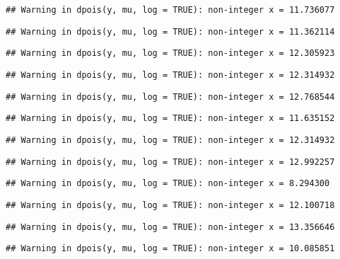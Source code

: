 \documentclass[
]{article}
\begin{document}
\begin{verbatim}
## Warning in dpois(y, mu, log = TRUE): non-integer x = 11.736077
\end{verbatim}

\begin{verbatim}
## Warning in dpois(y, mu, log = TRUE): non-integer x = 11.362114
\end{verbatim}

\begin{verbatim}
## Warning in dpois(y, mu, log = TRUE): non-integer x = 12.305923
\end{verbatim}

\begin{verbatim}
## Warning in dpois(y, mu, log = TRUE): non-integer x = 12.314932
\end{verbatim}

\begin{verbatim}
## Warning in dpois(y, mu, log = TRUE): non-integer x = 12.768544
\end{verbatim}

\begin{verbatim}
## Warning in dpois(y, mu, log = TRUE): non-integer x = 11.635152
\end{verbatim}

\begin{verbatim}
## Warning in dpois(y, mu, log = TRUE): non-integer x = 12.314932
\end{verbatim}

\begin{verbatim}
## Warning in dpois(y, mu, log = TRUE): non-integer x = 12.992257
\end{verbatim}

\begin{verbatim}
## Warning in dpois(y, mu, log = TRUE): non-integer x = 8.294300
\end{verbatim}

\begin{verbatim}
## Warning in dpois(y, mu, log = TRUE): non-integer x = 12.100718
\end{verbatim}

\begin{verbatim}
## Warning in dpois(y, mu, log = TRUE): non-integer x = 13.356646
\end{verbatim}

\begin{verbatim}
## Warning in dpois(y, mu, log = TRUE): non-integer x = 10.085851
\end{verbatim}
\end{document}
